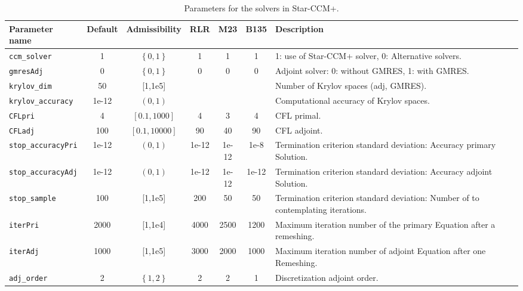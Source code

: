 \documentclass[a4paper,oneside]{book}
\numberwithin{equation}{section}
\begin{document}
\begin{table}[!htbp]
    \begin{tabular}{|l|c|c|c|c|c|p{6.5cm}|}
        \hline 
        \cellcolor{light-gray}\textbf{Parameter name} & \cellcolor{light-gray}\textbf{Default} & \cellcolor{light-gray}\textbf{Admissibility} & \cellcolor{light-gray}\textbf{RLR} & \cellcolor{light-gray}\textbf{M23} & \cellcolor{light-gray}\textbf{B135} & \cellcolor{light-gray}\textbf{Description} \\ 
        \hline 
        \verb|ccm_solver| & 1 & $\left\{0,1\right\}$ & 1 & 1 & 1 & 1: use of Star-CCM+ solver, 0: Alternative solvers. \\ 
        \hline 
        \texttt{gmresAdj} & 0 & $\left\{0,1\right\}$ & 0 & 0 & 0 & Adjoint solver: 0: without GMRES, 1: with GMRES. \\ 
        \hline 
        \verb|krylov_dim| & 50 & [1,1e5] &  &  &  & Number of Krylov spaces (adj,
        GMRES). \\ 
        \hline 
        \verb|krylov_accuracy| & 1e-12 & $\left(0,1\right)$ &  &  &  & Computational accuracy of Krylov spaces. \\ 
        \hline 
        \texttt{CFLpri} & 4 & $\left[0.1,1000\right]$ & 4 & 3 & 4 & CFL primal. \\ 
        \hline 
        \texttt{CFLadj} & 100 & $\left[0.1,10000\right]$ & 90 & 40 & 90 & CFL adjoint. \\ 
        \hline 
        \verb|stop_accuracyPri| & 1e-12 & $\left(0,1\right)$ & 1e-12 & 1e-12 & 1e-8 & Termination criterion standard deviation: Accuracy primary Solution. \\ 
        \hline 
        \verb|stop_accuracyAdj| & 1e-12 & $\left(0,1\right)$ & 1e-12 & 1e-12 & 1e-12 & Termination criterion standard deviation: Accuracy adjoint Solution. \\ 
        \hline 
        \verb|stop_sample| & 100 & [1,1e5] & 200 & 50 & 50 & Termination criterion standard deviation: Number of to contemplating iterations. \\ 
        \hline 
        \texttt{iterPri} & 2000 & [1,1e4] & 4000 & 2500 & 1200 & Maximum iteration number of the primary Equation after a remeshing. \\ 
        \hline 
        \texttt{iterAdj} & 1000 & [1,1e5] & 3000 & 2000 & 1000 & Maximum iteration number of adjoint Equation after one Remeshing. \\ 
        \hline 
        \verb|adj_order| & 2 & $\left\{1,2\right\}$ & 2 & 2 & 1 & Discretization adjoint order. \\ 
        \hline 
    \end{tabular} 
    \caption{Parameters for the solvers in Star-CCM+.}    
\end{table}
\end{document}
